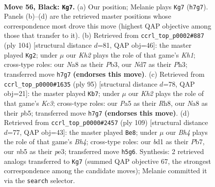 \documentclass[11pt]{article}
\begin{document}
\clearpage

\begin{figure}[p]\centering
\begin{subfigure}{0.46\textwidth}\centering
\resizebox{\linewidth}{!}{%
\newchessgame
\chessboard[
  setfen={n7/1p1n3k/1b6/pN1p3b/5B1p/PP2P3/4P3/3B2K1 b - - 9 56},
  showmover=false,
  pgfstyle=straightmove, color=movearrow, markmove={h7-g7}
]}
\caption{}
\end{subfigure}\hfill
\begin{subfigure}{0.46\textwidth}\centering
\resizebox{\linewidth}{!}{%
\newchessgame
\chessboard[
  setfen={5r1k/2R3p1/7p/p3B2n/1bN5/1P3P1P/8/7K w - - 1 53},
  showmover=false,
  pgfstyle=straightmove, color=movearrow, markmove={h1-g2}
]}
\caption{}
\end{subfigure}
\\[4pt]
\begin{subfigure}{0.46\textwidth}\centering
\resizebox{\linewidth}{!}{%
\newchessgame
\chessboard[
  setfen={7r/5p2/2k2b2/KP1p1p2/3P1p2/2B2P2/1P6/5R2 b - - 0 48},
  showmover=false,
  pgfstyle=straightmove, color=movearrow, markmove={c6-b7}
]}
\caption{}
\end{subfigure}\hfill
\begin{subfigure}{0.46\textwidth}\centering
\resizebox{\linewidth}{!}{%
\newchessgame
\chessboard[
  setfen={8/1p2k3/2pb1p2/p6b/P4P2/1B2PP2/1P2K3/5N2 b - - 52 55},
  showmover=false,
  pgfstyle=straightmove, color=movearrow, markmove={h5-e8}
]}
\caption{}
\end{subfigure}
\caption{\textbf{Move 56, Black: \texttt{Kg7}.} (a) Our position; Melanie plays \texttt{Kg7} (\texttt{h7g7}). Panels (b)--(d) are the retrieved master positions whose correspondence most drove this move (highest QAP objective among those that transfer to it). (b) Retrieved from \texttt{ccrl\_top\_p0002\#887} (ply 104) [structural distance $d$=81, QAP obj=46]: the master played \texttt{Kg2}; under $\mu$ our \emph{Kh2} plays the role of that game's \emph{Kh1}; cross-type roles: our \emph{N}a8 as their \emph{P}b3, our \emph{N}d7 as their \emph{P}h3; transferred move \texttt{h7g7} \textbf{(endorses this move)}. (c) Retrieved from \texttt{ccrl\_top\_p0000\#1635} (ply 95) [structural distance $d$=78, QAP obj=21]: the master played \texttt{Kb7}; under $\mu$ our \emph{Kh2} plays the role of that game's \emph{Kc3}; cross-type roles: our \emph{P}a5 as their \emph{R}h8, our \emph{N}a8 as their \emph{p}b5; transferred move \texttt{h7g7} \textbf{(endorses this move)}. (d) Retrieved from \texttt{ccrl\_top\_p0000\#2457} (ply 109) [structural distance $d$=77, QAP obj=43]: the master played \texttt{Be8}; under $\mu$ our \emph{Bh4} plays the role of that game's \emph{Bh4}; cross-type roles: our \emph{b}d1 as their \emph{P}b7, our \emph{n}b5 as their \emph{p}e3; transferred move \texttt{h5g6}. Synthesis: 2 retrieved analogs transferred to \texttt{Kg7} (summed QAP objective 67, the strongest correspondence among the candidate moves); Melanie committed it via the \texttt{search} selector.}
\label{fig:thought-m111}
\end{figure}
\end{document}
